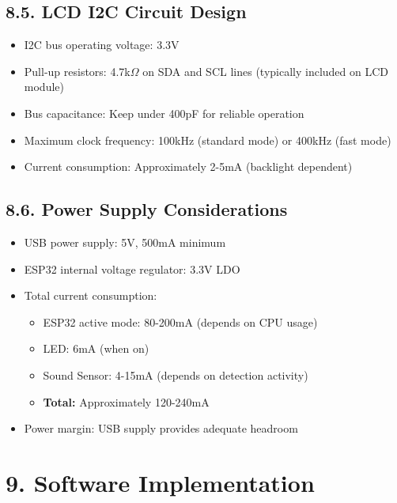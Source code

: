 \documentclass[12pt]{article}
\begin{document}
\subsection*{8.5. LCD I2C Circuit Design}

\begin{itemize}
    \item I2C bus operating voltage: 3.3V
    \item Pull-up resistors: 4.7k$\Omega$ on SDA and SCL lines (typically included on LCD module)
    \item Bus capacitance: Keep under 400pF for reliable operation
    \item Maximum clock frequency: 100kHz (standard mode) or 400kHz (fast mode)
    \item Current consumption: Approximately 2-5mA (backlight dependent)
\end{itemize}

\subsection*{8.6. Power Supply Considerations}

\begin{itemize}
    \item USB power supply: 5V, 500mA minimum
    \item ESP32 internal voltage regulator: 3.3V LDO
    \item Total current consumption:
    \begin{itemize}
        \item ESP32 active mode: 80-200mA (depends on CPU usage)
\item LED: 6mA (when on)
\item Sound Sensor: 4-15mA (depends on detection activity)
        \item \textbf{Total:} Approximately 120-240mA
    \end{itemize}
    \item Power margin: USB supply provides adequate headroom
\end{itemize}



\section*{9. Software Implementation}
\end{document}
